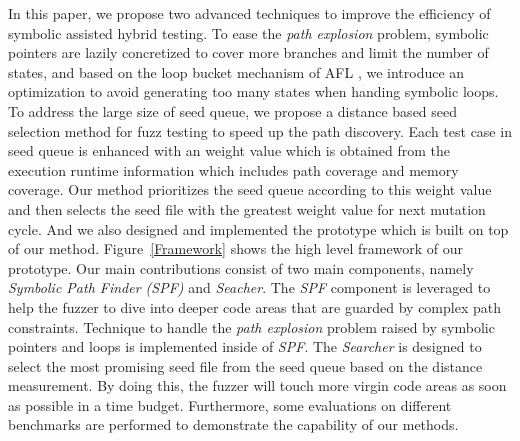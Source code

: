 In this paper, we propose two advanced techniques to improve the efficiency of symbolic assisted hybrid testing.
 To ease the \textit{path explosion} problem, symbolic pointers are lazily concretized to cover more branches and limit the number of states,
 and based on the loop bucket mechanism of AFL \cite{online:afl}, 
 we introduce an optimization to avoid generating too many states when handing symbolic loops. 
 To address the large size of seed queue, 
 we propose a distance based seed selection method for fuzz testing to speed up the path discovery. 
 Each test case in seed queue is enhanced with an weight value 
 which is obtained from the execution runtime information which includes path coverage and memory coverage.
 Our method prioritizes the seed queue according to this weight value and 
 then selects the seed file with the greatest weight value for next mutation cycle.
 And we also designed and implemented the prototype which is built on top of our method. 
 Figure~\ref{Framework} shows the high level framework of our prototype.
 Our main contributions consist of two main components, namely \emph{Symbolic Path Finder (SPF)} and \emph{Seacher}. 
 The \emph{SPF} component is leveraged to help the fuzzer to dive into deeper code areas 
 that are guarded by complex path constraints. 
 Technique to handle the \textit{path explosion} problem 
 raised by symbolic pointers and loops 
 is implemented inside of \emph{SPF}. 
 The \emph{Searcher} is designed to select the most promising seed file 
 from the seed queue based on the distance measurement. 
 By doing this, the fuzzer will touch more virgin code areas as soon as possible in a time budget. 
 Furthermore, some evaluations on different benchmarks are performed to demonstrate the capability of our methods.

